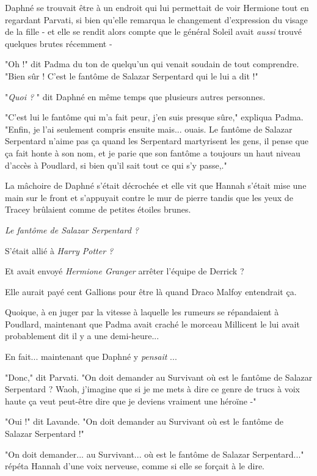 Daphné se trouvait être à un endroit qui lui permettait de voir Hermione tout en regardant Parvati, si bien qu'elle remarqua le changement d'expression du visage de la fille - et elle se rendit alors compte que le général Soleil avait \emph{aussi}  trouvé quelques brutes récemment -

"Oh !" dit Padma du ton de quelqu'un qui venait soudain de tout comprendre. "Bien sûr ! C'est le fantôme de Salazar Serpentard qui le lui a dit !"

"\emph{Quoi ?} " dit Daphné en même temps que plusieurs autres personnes.

"C'est lui le fantôme qui m'a fait peur, j'en suis presque sûre," expliqua Padma. "Enfin, je l'ai seulement compris ensuite mais... ouais. Le fantôme de Salazar Serpentard n'aime pas ça quand les Serpentard martyrisent les gens, il pense que ça fait honte à son nom, et je parie que son fantôme a toujours un haut niveau d'accès à Poudlard, si bien qu'il sait tout ce qui s'y passe,."

La mâchoire de Daphné s'était décrochée et elle vit que Hannah s'était mise une main sur le front et s'appuyait contre le mur de pierre tandis que les yeux de Tracey brûlaient comme de petites étoiles brunes.

\emph{Le fantôme de Salazar Serpentard ?} 

S'était allié à \emph{Harry Potter ?} 

Et avait envoyé \emph{Hermione Granger}  arrêter l'équipe de Derrick ?

Elle aurait payé cent Gallions pour être là quand Draco Malfoy entendrait ça.

Quoique, à en juger par la vitesse à laquelle les rumeurs se répandaient à Poudlard, maintenant que Padma avait craché le morceau Millicent le lui avait probablement dit il y a une demi-heure...

En fait... maintenant que Daphné y \emph{pensait} ...

"Donc," dit Parvati. "On doit demander au Survivant où est le fantôme de Salazar Serpentard ? Waoh, j'imagine que si je me mets à dire ce genre de trucs à voix haute ça veut peut-être dire que je deviens vraiment une héroïne -"

"Oui !" dit Lavande. "On doit demander au Survivant où est le fantôme de Salazar Serpentard !"

"On doit demander... au Survivant... où est le fantôme de Salazar Serpentard..." répéta Hannah d'une voix nerveuse, comme si elle se forçait à le dire.


